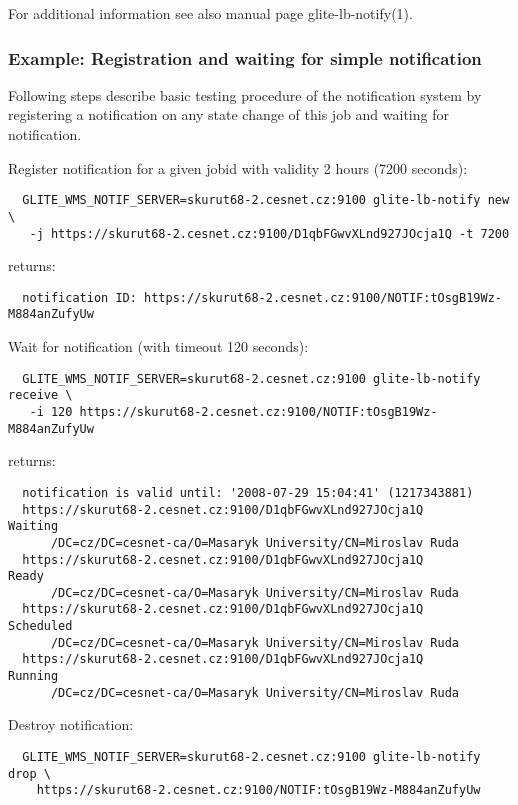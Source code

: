 For additional information see also manual page glite-lb-notify(1).

\subsubsection{Example: Registration and waiting for simple notification}
\label{e:notify}

Following steps describe basic testing procedure of the notification
system by registering a notification on any state change of this job
and waiting for notification.

Register notification for a given jobid
with validity 2 hours (7200 seconds):

\begin{verbatim}
  GLITE_WMS_NOTIF_SERVER=skurut68-2.cesnet.cz:9100 glite-lb-notify new \
   -j https://skurut68-2.cesnet.cz:9100/D1qbFGwvXLnd927JOcja1Q -t 7200
\end{verbatim}

returns:

\begin{verbatim}
  notification ID: https://skurut68-2.cesnet.cz:9100/NOTIF:tOsgB19Wz-M884anZufyUw 
\end{verbatim}


Wait for notification (with timeout 120 seconds):
\begin{verbatim}
  GLITE_WMS_NOTIF_SERVER=skurut68-2.cesnet.cz:9100 glite-lb-notify receive \
   -i 120 https://skurut68-2.cesnet.cz:9100/NOTIF:tOsgB19Wz-M884anZufyUw 
\end{verbatim}

returns:
\begin{verbatim}
  notification is valid until: '2008-07-29 15:04:41' (1217343881)
  https://skurut68-2.cesnet.cz:9100/D1qbFGwvXLnd927JOcja1Q        Waiting
      /DC=cz/DC=cesnet-ca/O=Masaryk University/CN=Miroslav Ruda
  https://skurut68-2.cesnet.cz:9100/D1qbFGwvXLnd927JOcja1Q        Ready
      /DC=cz/DC=cesnet-ca/O=Masaryk University/CN=Miroslav Ruda
  https://skurut68-2.cesnet.cz:9100/D1qbFGwvXLnd927JOcja1Q        Scheduled
      /DC=cz/DC=cesnet-ca/O=Masaryk University/CN=Miroslav Ruda
  https://skurut68-2.cesnet.cz:9100/D1qbFGwvXLnd927JOcja1Q        Running
      /DC=cz/DC=cesnet-ca/O=Masaryk University/CN=Miroslav Ruda
\end{verbatim}

Destroy notification:
\begin{verbatim}
  GLITE_WMS_NOTIF_SERVER=skurut68-2.cesnet.cz:9100 glite-lb-notify drop \
    https://skurut68-2.cesnet.cz:9100/NOTIF:tOsgB19Wz-M884anZufyUw
\end{verbatim}

